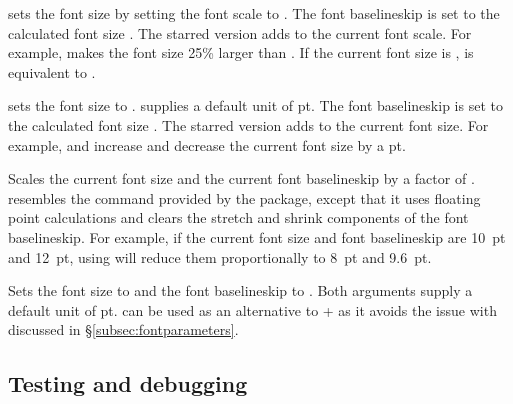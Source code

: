 \documentclass{beery}
\begin{document}
\nopagebreak\newline
{}

 sets the font size by setting the font scale to .
The font baselineskip is set to the calculated font size \texttimes{} .
The starred version  adds  to the current font scale.
For example,  makes the font size 25\% larger than .
If the current font size is ,  is equivalent to .

\nopagebreak\newline
{}

 sets the font size to .
 supplies a default unit of \unit{pt}.
The font baselineskip is set to the calculated font size \texttimes{} .
The starred version  adds  to the current font size.
For example,  and \marg{-1pt} increase and decrease the current font size by a \unit{pt}.

\KeepNextPar*

Scales the current font size and the current font baselineskip by a factor of .
 resembles the  command provided by the  package, except that it uses floating point calculations and clears the stretch and shrink components of the font baselineskip.
For example, if the current font size and font baselineskip are \qty{10}{pt} and \qty{12}{pt}, using  will reduce them proportionally to \qty{8}{pt} and \qty{9.6}{pt}.

\KeepNextPar*

Sets the font size to  and the font baselineskip to .
Both arguments supply a default unit of \unit{pt}.
 can be used as an alternative to  +  as it avoids the issue with  discussed in \S\ref{subsec:fontparameters}.

\subsection{Testing and debugging}
\label{subsec:debug}
\end{document}
